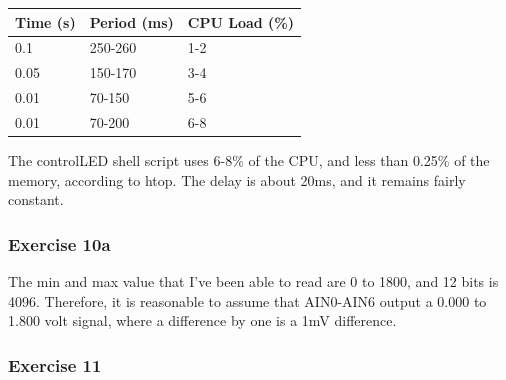 \documentclass[letterpaper,10pt]{texMemo}
\begin{document}
\begin{center}
\begin{tabular}{| l | l | l |}
\hline
\textbf{Time (s)} & \textbf{Period (ms)} & \textbf{CPU Load (\%)}\\
\hline
0.1 & 250-260 & 1-2\\
\hline
0.05 & 150-170 & 3-4\\
\hline
0.01 & 70-150  & 5-6\\ 
\hline
0.01 & 70-200 & 6-8\\
\hline
\end{tabular}
\end{center}

%

%

% 
%

\noindent The controlLED shell script uses 6-8\% of the CPU, and less than
0.25\% of the memory, according to htop. The delay is about 20ms, and it remains
fairly constant.

\subsubsection{Exercise 10a}
\noindent The min and max value that I've been able to read are 0 to 1800,
and 12 bits is 4096. Therefore, it is reasonable to assume that AIN0-AIN6
output a 0.000 to 1.800 volt signal, where a difference by one is a 1mV
difference.

%

\subsubsection{Exercise 11}
\end{document}
